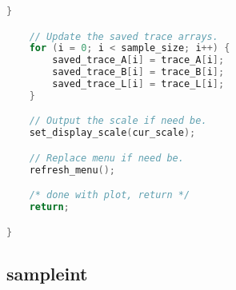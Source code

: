 \begin{lstlisting}[language=C]
    }

    // Update the saved trace arrays.
    for (i = 0; i < sample_size; i++) {
    	saved_trace_A[i] = trace_A[i];
    	saved_trace_B[i] = trace_B[i];
    	saved_trace_L[i] = trace_L[i];
    }

    // Output the scale if need be.
    set_display_scale(cur_scale);

    // Replace menu if need be.
    refresh_menu();

    /* done with plot, return */
    return;

}
\end{lstlisting}

\subsection{sampleint}
\lstset{language=[niosii]Assembler}
